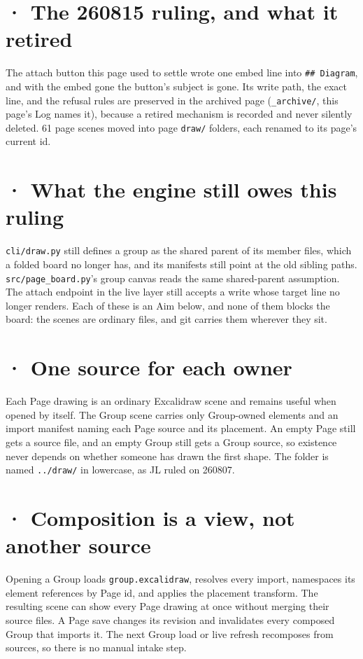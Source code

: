 
\section{· The 260815 ruling, and what it retired}
The attach button this page used to settle wrote one embed line into \texttt{## Diagram}, and with the embed gone the button's subject is gone. Its write path, the exact line, and the refusal rules are preserved in the archived page (\texttt{_archive/}, this page's Log names it), because a retired mechanism is recorded and never silently deleted. 61 page scenes moved into page \texttt{draw/} folders, each renamed to its page's current id.

\section{· What the engine still owes this ruling}
\texttt{cli/draw.py} still defines a group as the shared parent of its member files, which a folded board no longer has, and its manifests still point at the old sibling paths. \texttt{src/page_board.py}'s group canvas reads the same shared-parent assumption. The attach endpoint in the live layer still accepts a write whose target line no longer renders. Each of these is an Aim below, and none of them blocks the board: the scenes are ordinary files, and git carries them wherever they sit.

\section{· One source for each owner}
Each Page drawing is an ordinary Excalidraw scene and remains useful when opened by itself. The Group scene carries only Group-owned elements and an import manifest naming each Page source and its placement. An empty Page still gets a source file, and an empty Group still gets a Group source, so existence never depends on whether someone has drawn the first shape. The folder is named \texttt{../draw/} in lowercase, as JL ruled on 260807.

\section{· Composition is a view, not another source}
Opening a Group loads \texttt{group.excalidraw}, resolves every import, namespaces its element references by Page id, and applies the placement transform. The resulting scene can show every Page drawing at once without merging their source files. A Page save changes its revision and invalidates every composed Group that imports it. The next Group load or live refresh recomposes from sources, so there is no manual intake step.

